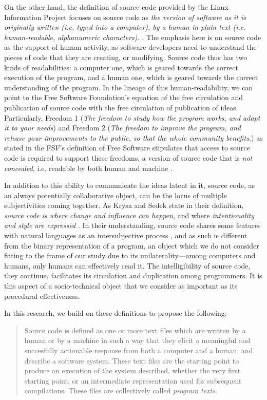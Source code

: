 On the other hand, the definition of source code provided by the Linux Information Project focuses on source code as \emph{the version of software as it is originally written (i.e. typed into a computer), by a human in plain text (i.e. human-readable, alphanumeric characters).} \citep{linuxinformationproject_source_2006}. The emphasis here is on source code as the support of human activity, as software developers need to understand the pieces of code that they are creating, or modifying. Source code thus has two kinds of readabilities: a computer one, which is geared towards the correct execution of the program, and a human one, which is geared towards the correct understanding of the program. In the lineage of this human-readability, we can point to the Free Software Foundation's equation of the free circulation and publication of source code with the free circulation of publication of ideas. Particularly, Freedom 1 (\emph{The freedom to study how the program works, and adapt it to your needs}) and Freedom 2 (\emph{The freedom to improve the program, and release your improvements to the public, so that the whole community benefits.}) as stated in the FSF's definition of Free Software stipulates that access to source code is required to support these freedoms, a version of source code that is \emph{not concealed}, i.e. readable by both human and machine \citep{stallman_free_2002}.

In addition to this ability to communicate the ideas latent in it, source code, as an always potentially collaborative object, can be the locus of multiple subjectivities coming together. As Krysa and Sedek state in their definition, \emph{source code is where change and influence can happen}, and where \emph{intentionality and style are expressed} \citep{fuller_software_2008}. In their understanding, source code shares some features with natural languages as an intersubjective process \citep{voloshinov_marxism_1986}, and as such is different from the binary representation of a program, an object which we do not consider fitting to the frame of our study due to its unilaterality—among computers and humans, only humans can effectively read it. The intelligibility of source code, they continue, facilitates its circulation and duplication among programmers. It is this aspect of a socio-technical object that we consider as important as its procedural effectiveness.

In this research, we build on these definitions to propose the following:

\begin{quote}
    Source code is defined as one or more text files which are written by a human or by a machine in such a way that they elicit a meaningful and succesfully actionable response from both a computer and a human, and describe a software system. These text files are the starting point to produce an execution of the system described, whether the very first starting point, or an intermediate representation used for subsequent compilations. These files are collectively called \emph{program texts}.
\end{quote}

